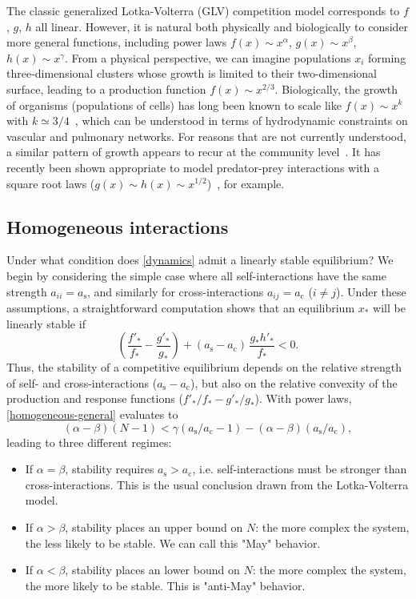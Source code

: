\documentclass[
 reprint,
 amsmath,amssymb,
 aps,
]{revtex4-2}
\begin{document}
The classic generalized Lotka-Volterra (GLV) competition model corresponds to $f$, $g$, $h$ all linear. 
However, it is natural both physically and biologically to consider more general functions, including power laws $f(x)\sim x^\alpha$, $g(x)\sim x^\beta$, $h(x) \sim x^\gamma$. 
From a physical perspective, we can imagine populations $x_i$ forming three-dimensional clusters whose growth is limited to their two-dimensional surface, leading to a production function $f(x) \sim x^{2/3}$. 
Biologically, the growth of organisms (populations of cells) has long been known to scale like $f(x) \sim x^k$ with $k\simeq 3/4$~\cite{Brown2004}, which can be understood in terms of hydrodynamic constraints on vascular and pulmonary networks. 
For reasons that are not currently understood, a similar pattern of growth appears to recur at the community level~\cite{Hatton2015,Hatton2023}. 
It has recently been shown appropriate to model predator-prey interactions with a square root laws ($g(x) \sim h(x) \sim x^{1/2}$)~\cite{Barbier2021,Mazzarisi2023}, for example. 

\subsection{Homogeneous interactions}

Under what condition does \eqref{dynamics} admit a linearly stable equilibrium? We begin by considering the simple case where all self-interactions have the same strength $a_{ii} = a_{\textrm{s}}$, and similarly for cross-interactions $a_{ij} = a_{\textrm{c}}$ ($i\neq j$). Under these assumptions, a straightforward computation shows that an equilibrium $x_*$ will be linearly stable if  
\begin{equation}\label{homogeneous-general}
    \left(\frac{f'_*}{f_*} - \frac{g'_*}{g_*}\right) + (a_{\textrm{s}} - a_{\textrm{c}})\,\frac{g_*h'_*}{f_*} < 0. 
\end{equation}
Thus, the stability of a competitive equilibrium depends on the relative strength of self- and cross-interactions ($a_{\textrm{s}} - a_{\textrm{c}}$), but also on the relative convexity of the production and response functions ($f'_*/f_* - g'_*/g_*$). With power laws, \eqref{homogeneous-general} evaluates to 
\begin{equation}
    (\alpha - \beta)(N-1) < \gamma(a_{\textrm{s}}/a_{\textrm{c}}- 1) - (\alpha - \beta)(a_{\textrm{s}}/a_{\textrm{c}}),
\end{equation}
leading to three different regimes:
\begin{itemize}
    \item If $\alpha = \beta$, stability requires $a_{\textrm{s}} > a_{\textrm{c}}$, i.e. self-interactions must be stronger than cross-interactions. This is the usual conclusion drawn from the Lotka-Volterra model. 
    \item If $\alpha > \beta$, stability places an upper bound on $N$: the more complex the system, the less likely to be stable. 
    We can call this "May" behavior.
    \item If $\alpha < \beta$, stability places an lower bound on $N$: the more complex the system, the more likely to be stable. This is "anti-May" behavior.
\end{itemize}
\end{document}
